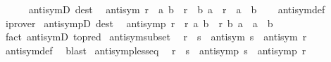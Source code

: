 \begin{isabellebody}
\endisatagproof
{\isafoldproof}%
%
\isadelimproof
\isanewline
%
\endisadelimproof
\ \ \ \ \isanewline
{}\isamarkupfalse%
\ antisymD\ {\isacharbrackleft}{\kern0pt}dest{\isacharquery}{\kern0pt}{\isacharbrackright}{\kern0pt}{\isacharcolon}{\kern0pt}\isanewline
\ \ {\isachardoublequoteopen}antisym\ r\ {\isasymLongrightarrow}\ {\isacharparenleft}{\kern0pt}a{\isacharcomma}{\kern0pt}\ b{\isacharparenright}{\kern0pt}\ {\isasymin}\ r\ {\isasymLongrightarrow}\ {\isacharparenleft}{\kern0pt}b{\isacharcomma}{\kern0pt}\ a{\isacharparenright}{\kern0pt}\ {\isasymin}\ r\ {\isasymLongrightarrow}\ a\ {\isacharequal}{\kern0pt}\ b{\isachardoublequoteclose}\isanewline
%
\isadelimproof
\ \ %
\endisadelimproof
%
\isatagproof
{}\isamarkupfalse%
\ antisym{\isacharunderscore}{\kern0pt}def\ \isamarkupfalse%
\ iprover%
\endisatagproof
{\isafoldproof}%
%
\isadelimproof
\isanewline
%
\endisadelimproof
\isanewline
{}\isamarkupfalse%
\ antisympD\ {\isacharbrackleft}{\kern0pt}dest{\isacharquery}{\kern0pt}{\isacharbrackright}{\kern0pt}{\isacharcolon}{\kern0pt}\isanewline
\ \ {\isachardoublequoteopen}antisymp\ r\ {\isasymLongrightarrow}\ r\ a\ b\ {\isasymLongrightarrow}\ r\ b\ a\ {\isasymLongrightarrow}\ a\ {\isacharequal}{\kern0pt}\ b{\isachardoublequoteclose}\isanewline
%
\isadelimproof
\ \ %
\endisadelimproof
%
\isatagproof
{}\isamarkupfalse%
\ {\isacharparenleft}{\kern0pt}fact\ antisymD\ {\isacharbrackleft}{\kern0pt}to{\isacharunderscore}{\kern0pt}pred{\isacharbrackright}{\kern0pt}{\isacharparenright}{\kern0pt}%
\endisatagproof
{\isafoldproof}%
%
\isadelimproof
\isanewline
%
\endisadelimproof
\isanewline
{}\isamarkupfalse%
\ antisym{\isacharunderscore}{\kern0pt}subset{\isacharcolon}{\kern0pt}\isanewline
\ \ {\isachardoublequoteopen}r\ {\isasymsubseteq}\ s\ {\isasymLongrightarrow}\ antisym\ s\ {\isasymLongrightarrow}\ antisym\ r{\isachardoublequoteclose}\isanewline
%
\isadelimproof
\ \ %
\endisadelimproof
%
\isatagproof
{}\isamarkupfalse%
\ antisym{\isacharunderscore}{\kern0pt}def\ \isamarkupfalse%
\ blast%
\endisatagproof
{\isafoldproof}%
%
\isadelimproof
\isanewline
%
\endisadelimproof
\isanewline
{}\isamarkupfalse%
\ antisymp{\isacharunderscore}{\kern0pt}less{\isacharunderscore}{\kern0pt}eq{\isacharcolon}{\kern0pt}\isanewline
\ \ {\isachardoublequoteopen}r\ {\isasymle}\ s\ {\isasymLongrightarrow}\ antisymp\ s\ {\isasymLongrightarrow}\ antisymp\ r{\isachardoublequoteclose}\isanewline
%
\isadelimproof
\ \ %
\endisadelimproof
%
\isatagproof
{}\isamarkupfalse%

\end{isabellebody}
